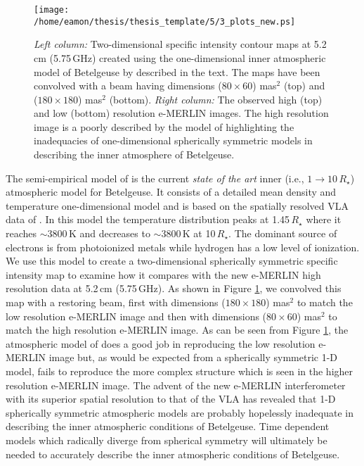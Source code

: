 \begin{figure}[!ht]
\centering 
          \texttt{[image: /home/eamon/thesis/thesis\_template/5/3\_plots\_new.ps]}
\caption[]{\textit{Left column:} Two-dimensional specific intensity contour maps at 5.2\,cm (5.75\,GHz) created using the one-dimensional inner atmospheric model of Betelgeuse by \cite{harper_2001} described in the text. The maps have been convolved with a beam having dimensions ($80\times 60$) mas$^2$ (top) and ($180\times 180$) mas$^2$ (bottom). \textit{Right column:} The observed high (top) and low (bottom) resolution e-MERLIN images. The high resolution image is a poorly described by the model of \cite{harper_2001} highlighting the inadequacies of one-dimensional spherically symmetric models in describing the inner atmosphere of Betelgeuse.}
\label{fig:5.15}
\end{figure}

The semi-empirical model of \cite{harper_2001} is the current \textit{state of the art} inner (i.e., $1 \rightarrow 10\,R_{\star}$) atmospheric model for Betelgeuse. It consists of a detailed mean density and temperature one-dimensional model and is based on the spatially resolved VLA data of \cite{lim_1998}. In this model the temperature distribution peaks at 1.45\,$R_{\star}$ where it reaches $\sim 3800$\,K and decreases to $\sim 3800$\,K at 10\,$R_{\star}$. The dominant source of electrons is from photoionized metals while hydrogen has a low level of ionization. 
We use this model to create a two-dimensional spherically symmetric specific intensity map to examine how it compares with the new e-MERLIN high resolution data at 5.2\,cm (5.75\,GHz). As shown in Figure \ref{fig:5.15}, we convolved this map with a restoring beam, first with dimensions ($180\times 180$) mas$^2$ to match the low resolution e-MERLIN image and then with dimensions ($80\times 60$) mas$^2$ to match the high resolution e-MERLIN image. As can be seen from Figure  \ref{fig:5.15}, the atmospheric model of \cite{harper_2001} does a good job in reproducing the low resolution e-MERLIN image but, as would be expected from a spherically symmetric 1-D model, fails to reproduce the more complex structure which is seen in the higher resolution e-MERLIN image. The advent of the new e-MERLIN interferometer with its superior spatial resolution to that of the VLA has revealed that 1-D spherically symmetric atmospheric models are probably hopelessly inadequate in describing the inner atmospheric conditions of Betelgeuse. Time dependent models which radically diverge from spherical symmetry will ultimately be needed to accurately describe the inner atmospheric conditions of Betelgeuse.

